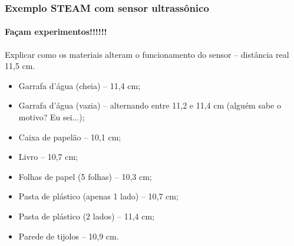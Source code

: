 \documentclass{beamer}
\begin{document}
\begin{frame}
\frametitle{Exemplo STEAM com sensor ultrassônico}
\framesubtitle{Façam experimentos!!!!!!}

		\begin{block}{Explicar como os materiais alteram o funcionamento do sensor -- distância real 11,5 cm.}
			\begin{itemize}
				\item Garrafa d'água (cheia) -- 11,4 cm;
 				\item Garrafa d'água (vazia) -- alternando entre 11,2 e 11,4 cm (alguém sabe o motivo? Eu sei...);
 				\item Caixa de papelão -- 10,1 cm;
 				\item Livro -- 10,7 cm;
 				\item Folhas de papel (5 folhas) -- 10,3 cm;
 				\item Pasta de plástico (apenas 1 lado) -- 10,7 cm;
 				\item Pasta de plástico (2 lados) -- 11,4 cm;
 				\item Parede de tijolos -- 10,9 cm.
 			\end{itemize}
		\end{block}
\end{frame}
\end{document}
